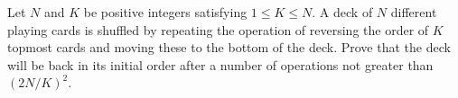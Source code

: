 Let $N$ and $K$ be positive integers satisfying $1 \leq K \leq N$. A deck of $N$ different playing cards is shuffled by repeating the operation of reversing the order of $K$ topmost cards and moving these to the bottom of the deck. Prove that the deck will be back in its initial order after a number of operations not greater than $(2N/K)^2$.